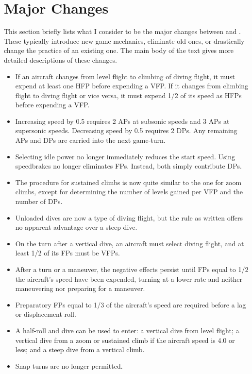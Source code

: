 \documentclass[10pt]{article}
\begin{document}
\section{Major Changes}

This section briefly lists what I consider to be the major changes between {\AirSup} and {\AirPow}. These  typically introduce new game mechanics, eliminate old ones, or drastically change the practice of an existing one. The main body of the text gives more detailed descriptions of these changes.

\begin{itemize}
    \item If an aircraft changes from level flight to climbing of diving flight, it must expend at least one HFP before expending a VFP. If it changes from climbing flight to diving flight or vice versa, it must expend 1/2 of its speed as HFPs before expending a VFP.
    \item Increasing speed by 0.5 requires 2 APs at subsonic speeds and 3 APs at supersonic speeds. Decreasing speed by 0.5 requires 2 DPs. Any remaining APs and DPs are carried into the next game-turn.
    \item Selecting idle power no longer immediately reduces the start speed. Using speedbrakes no longer eliminates FPs. Instead, both simply contribute DPs.
    \item The procedure for sustained climbs is now quite similar to the one for zoom climbs, except for determining the number of levels gained per VFP and the number of DPs.
    \item Unloaded dives are now a type of diving flight, but the rule as written offers no apparent advantage over a steep dive.
    \item On the turn after a vertical dive, an aircraft must select diving flight, and at least 1/2 of its FPs must be VFPs.
    \item After a turn or a maneuver, the negative effects persist until FPs equal to 1/2 the aircraft's speed have been expended, turning at a lower rate and neither maneuvering nor preparing for a maneuver.
    \item Preparatory FPs equal to 1/3 of the aircraft's speed are required before a lag or displacement roll.
    \item A half-roll and dive can be used to enter: a vertical dive from level flight; a vertical dive from a zoom or sustained climb if the aircraft speed is 4.0 or less; and a steep dive from a vertical climb.
    \item Snap turns are no longer permitted.
\end{itemize}
\end{document}
